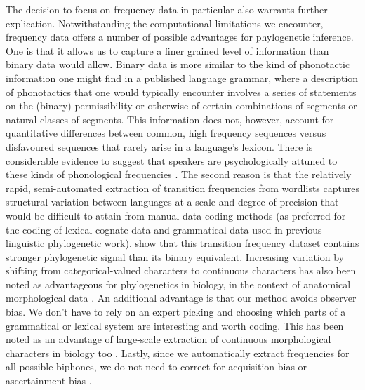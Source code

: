 \documentclass[]{article}
\begin{document}
The decision to focus on frequency data in particular also warrants further explication. Notwithstanding the computational limitations we encounter, frequency data offers a number of possible advantages for phylogenetic inference. One is that it allows us to capture a finer grained level of information than binary data would allow. Binary data is more similar to the kind of phonotactic information one might find in a published language grammar, where a description of phonotactics that one would typically encounter involves a series of statements on the (binary) permissibility or otherwise of certain combinations of segments or natural classes of segments. This information does not, however, account for quantitative differences between common, high frequency sequences versus disfavoured sequences that rarely arise in a language's lexicon. There is considerable evidence to suggest that speakers are psychologically attuned to these kinds of phonological frequencies \autocites{coleman_stochastic_1997}{zuraw_patterned_2000}{ernestus_predicting_2003}{albright_rules_2003}{eddington_spanish_2004}{hayes_stochastic_2006}{gordon_phonological_2016}. The second reason is that the relatively rapid, semi-automated extraction of transition frequencies from wordlists captures structural variation between languages at a scale and degree of precision that would be difficult to attain from manual data coding methods (as preferred for the coding of lexical cognate data and grammatical data used in previous linguistic phylogenetic work). \textcite{macklin-cordes_phylogenetic_2020} show that this transition frequency dataset contains stronger phylogenetic signal than its binary equivalent. Increasing variation by shifting from categorical-valued characters to continuous characters has also been noted as advantageous for phylogenetics in biology, in the context of anatomical morphological data \autocites{parins-fukuchi_use_2018}{wright_systematists_2019}. An additional advantage is that our method avoids observer bias. We don't have to rely on an expert picking and choosing which parts of a grammatical or lexical system are interesting and worth coding. This has been noted as an advantage of large-scale extraction of continuous morphological characters in biology too \autocite{wright_systematists_2019}. Lastly, since we automatically extract frequencies for all possible biphones, we do not need to correct for acquisition bias or ascertainment bias \autocite{leache_short_2015}.
\end{document}
